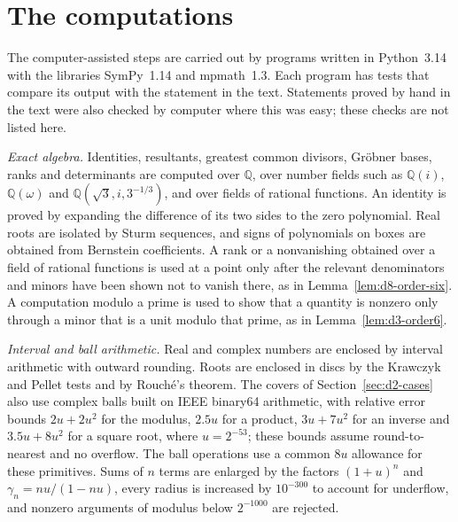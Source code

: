 \documentclass[11pt]{amsart}
\theoremstyle{definition}
\theoremstyle{remark}
\begin{document}














\appendix

\section{The computations}\label{app:verification}

The computer-assisted steps are carried out by programs written in Python~3.14 with the
libraries SymPy~1.14 and mpmath~1.3.  Each program has tests that compare its output with the
statement in the text.  Statements proved by hand in the text were also checked by computer
where this was easy; these checks are not listed here.

\emph{Exact algebra.}  Identities, resultants, greatest common divisors, Gr\"obner bases, ranks
and determinants are computed over $\mathbb Q$, over number fields such as $\mathbb Q(i)$,
$\mathbb Q(\omega)$ and $\mathbb Q(\sqrt3,i,3^{-1/3})$, and over fields of rational functions.
An identity is proved by expanding the difference of its two sides to the zero polynomial.  Real
roots are isolated by Sturm sequences, and signs of polynomials on boxes are obtained from
Bernstein coefficients.  A rank or a nonvanishing obtained over a field of rational functions is
used at a point only after the relevant denominators and minors have been shown not to vanish
there, as in Lemma~\ref{lem:d8-order-six}.  A computation modulo a prime is used to show that a
quantity is nonzero only through a minor that is a unit modulo that prime, as in
Lemma~\ref{lem:d3-order6}.

\emph{Interval and ball arithmetic.}  Real and complex numbers are enclosed by interval
arithmetic with outward rounding.  Roots are enclosed in discs by the Krawczyk and Pellet tests
and by Rouch\'e's theorem.  The covers of Section~\ref{sec:d2-cases} also use complex balls built
on IEEE binary64 arithmetic, with relative error bounds $2u+2u^2$ for the modulus, $2.5u$ for a
product, $3u+7u^2$ for an inverse and $3.5u+8u^2$ for a square root, where $u=2^{-53}$;
these bounds assume round-to-nearest and no overflow.  The ball operations use a common $8u$
allowance for these primitives.  Sums of $n$ terms are enlarged by the factors $(1+u)^n$ and
$\gamma_n=nu/(1-nu)$, every radius is increased by $10^{-300}$ to account for underflow, and
nonzero arguments of modulus below $2^{-1000}$ are rejected.
\end{document}
